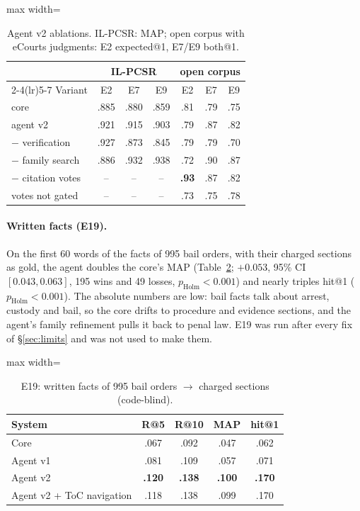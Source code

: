 \documentclass[sigconf,nonacm]{acmart}
\newcommand{\ph}{p_{\text{Holm}}}
\begin{document}
\begin{table}[t]
\centering\small
\caption{Agent v2 ablations. IL-PCSR: MAP; open corpus with eCourts judgments: E2 expected@1,
E7/E9 both@1.}
\label{tab:agentabl}
\begin{adjustbox}{max width=\linewidth}
\begin{tabular}{lcccccc}
\toprule
 & \multicolumn{3}{c}{IL-PCSR} & \multicolumn{3}{c}{open corpus} \\
\cmidrule(lr){2-4}\cmidrule(lr){5-7}
Variant & E2 & E7 & E9 & E2 & E7 & E9 \\
\midrule
core & .885 & .880 & .859 & .81 & .79 & .75 \\
agent v2 & .921 & .915 & .903 & .79 & .87 & .82 \\
\; $-$ verification & .927 & .873 & .845 & .79 & .79 & .70 \\
\; $-$ family search & .886 & .932 & .938 & .72 & .90 & .87 \\
\; $-$ citation votes & -- & -- & -- & \textbf{.93} & .87 & .82 \\
\; votes not gated & -- & -- & -- & .73 & .75 & .78 \\
\bottomrule
\end{tabular}
\end{adjustbox}
\end{table}

\paragraph{Written facts (E19).} On the first 60 words of the facts of 995 bail orders, with their
charged sections as gold, the agent doubles the core's MAP (Table~\ref{tab:facts}; $+0.053$, 95\% CI
$[0.043, 0.063]$, 195 wins and 49 losses, $\ph<0.001$) and nearly triples hit@1 ($\ph<0.001$). The
absolute numbers are low: bail facts talk about arrest, custody and bail, so the core drifts to
procedure and evidence sections, and the agent's family refinement pulls it back to penal law. E19
was run after every fix of \S\ref{sec:limits} and was not used to make them.

\begin{table}[t]
\centering\small
\caption{E19: written facts of 995 bail orders $\to$ charged sections (code-blind).}
\label{tab:facts}
\begin{adjustbox}{max width=\linewidth}
\begin{tabular}{lcccc}
\toprule
System & R@5 & R@10 & MAP & hit@1 \\
\midrule
Core & .067 & .092 & .047 & .062 \\
Agent v1 & .081 & .109 & .057 & .071 \\
Agent v2 & \textbf{.120} & \textbf{.138} & \textbf{.100} & \textbf{.170} \\
Agent v2 + ToC navigation & .118 & .138 & .099 & .170 \\
\bottomrule
\end{tabular}
\end{adjustbox}
\end{table}
\end{document}
